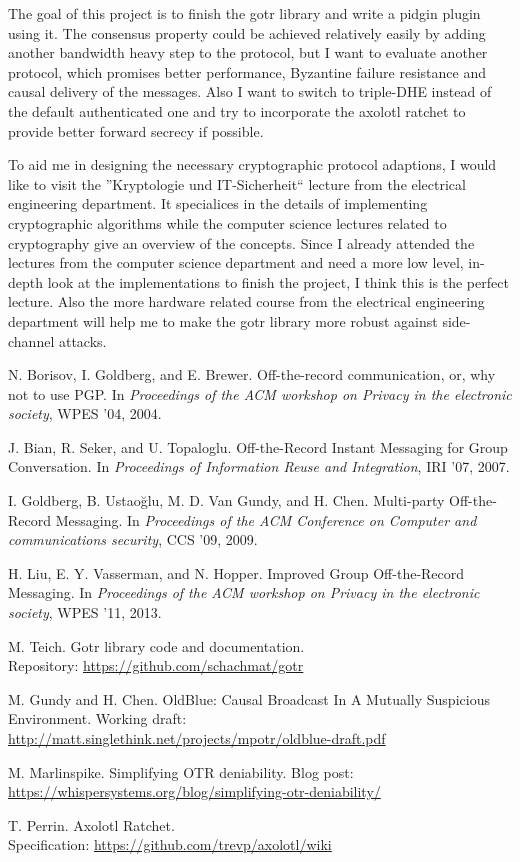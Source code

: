 \documentclass[10pt,a4paper]{article}
\begin{document}
The goal of this project is to finish the gotr library\cite{libgotr} and write a
pidgin plugin using it. The consensus property could be achieved relatively
easily by adding another bandwidth heavy step to the protocol, but I want to
evaluate another protocol\cite{oldblue}, which promises better performance,
Byzantine failure resistance and causal delivery of the messages. Also I want to
switch to triple-DHE\cite{tripledhe} instead of the default authenticated one
and try to incorporate the axolotl ratchet\cite{axolotl} to provide better
forward secrecy if possible.

To aid me in designing the necessary cryptographic protocol adaptions, I would
like to visit the ”Kryptologie und IT-Sicherheit“ lecture from the electrical
engineering department. It specialices in the details of implementing
cryptographic algorithms while the computer science lectures related to
cryptography give an overview of the concepts. Since I already attended the
lectures from the computer science department and need a more low level,
in-depth look at the implementations to finish the project, I think this is the
perfect lecture. Also the more hardware related course from the electrical
engineering department will help me to make the gotr library more robust against
side-channel attacks.

\begin{thebibliography}{xx}

	 N. Borisov, I. Goldberg, and E. Brewer. Off-the-record
		communication, or, why not to use PGP. In \textit{Proceedings of the ACM
		workshop on Privacy in the electronic society}, WPES ’04, 2004.

	 J. Bian, R. Seker, and U. Topaloglu. Off-the-Record Instant
		Messaging for Group Conversation. In \textit{Proceedings of Information
		Reuse and Integration}, IRI ’07, 2007.

	 I. Goldberg, B. Ustaoğlu, M. D. Van Gundy, and H. Chen.
		Multi-party Off-the-Record Messaging. In \textit{Proceedings of the ACM
		Conference on Computer and communications security}, CCS ’09, 2009.

	 H. Liu, E. Y. Vasserman, and N. Hopper. Improved Group
		Off-the-Record Messaging. In \textit{Proceedings of the ACM workshop on
		Privacy in the electronic society}, WPES ’11, 2013.

	 M. Teich.
		Gotr library code and documentation.\\Repository:
		\url{https://github.com/schachmat/gotr}

	 M. Gundy and H. Chen.
		OldBlue: Causal Broadcast In A Mutually Suspicious Environment.
		Working draft: \url{http://matt.singlethink.net/projects/mpotr/oldblue-draft.pdf}

	 M. Marlinspike.
		Simplifying OTR deniability. Blog post:
		\url{https://whispersystems.org/blog/simplifying-otr-deniability/}

	 T. Perrin.
		Axolotl Ratchet.\\Specification:
		\url{https://github.com/trevp/axolotl/wiki}

\end{thebibliography}
\end{document}
